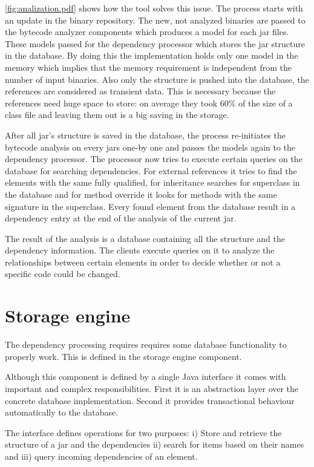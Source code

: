 \autoref{fig:analization.pdf} shows how the tool solves this issue. The process
starts with an update in the binary repository. The new, not analyzed binaries
are passed to the bytecode analyzer components which produces a model for each
jar files. These models passed for the dependency processor which stores the jar
structure in the database. By doing this the implementation holds only one model
in the memory which implies that the memory requirement is independent from the
number of input binaries. Also only the structure is pushed into the database,
the references are considered as transient data. This is necessary because the
references need huge space to store: on average they took 60\% of the size of a
class file and leaving them out is a big saving in the storage.
 
After all jar's  structure is saved in the database, the process re-initiates
the bytecode analysis on every jars one-by one and passes the models again to
the dependency processor. The processor now tries to execute certain queries on
the database for searching dependencies. For external references it tries to
find the elements with the same fully qualified, for inheritance searches for
superclass in the database and for method override it looks for methods with
the same signature in the superclass. Every found element from the database 
result in a dependency entry at the end of the analysis of the current jar. 

The result of the analysis is a database containing all the structure
and the dependency information. The clients execute queries on it to analyze the
relationships between certain elements in order to decide whether or not a
specific code could be changed.
 
\section{Storage engine} 

The dependency processing requires requires some database functionality to 
properly work. This is defined in the storage engine component.

Although this component is defined by a single Java interface it comes with
important and complex responsibilities. First it is an abstraction layer over
the concrete database implementation. Second it provides transactional behaviour
automatically to the database. 

The interface defines operations for two purposes: i) Store and retrieve the
structure of a jar and the dependencies ii) search for items based on their
names and iii) query incoming dependencies of an element.

